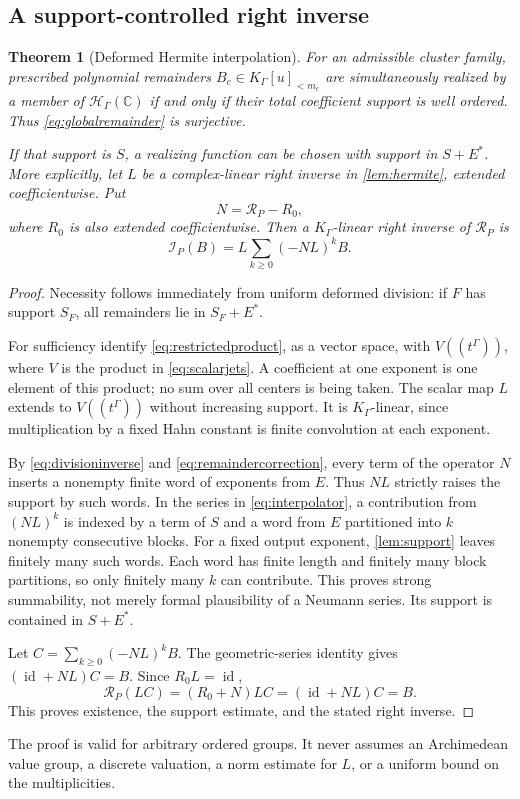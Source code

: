 \documentclass[11pt,letterpaper]{article}
\newtheorem{theorem}{Theorem}[section]
\theoremstyle{definition}
\theoremstyle{remark}
\newcommand{\C}{\mathbb C}
\newcommand{\HH}{\mathscr H_\Gamma}
\newcommand{\KG}{K_\Gamma}
\newcommand{\id}{\operatorname{id}}
\newcommand{\jet}{\mathcal R}
\numberwithin{equation}{section}
\begin{document}
\subsection{A support-controlled right inverse}
\begin{theorem}[Deformed Hermite interpolation]\label{thm:interpolation}
For an admissible cluster family, prescribed polynomial remainders $B_c\in\KG[u]_{<m_c}$ are simultaneously realized by a member of $\HH(\C)$ if and only if their total coefficient support is well ordered. Thus \eqref{eq:globalremainder} is surjective.

If that support is $S$, a realizing function can be chosen with support in $S+E^*$. More explicitly, let $L$ be a complex-linear right inverse in \cref{lem:hermite}, extended coefficientwise. Put
\[
 N=\jet_P-R_0,
\]
where $R_0$ is also extended coefficientwise. Then a $\KG$-linear right inverse of $\jet_P$ is
\begin{equation}\label{eq:interpolator}
 \mathcal I_P(B)=L\sum_{k\ge0}(-NL)^kB.
\end{equation}
\end{theorem}
\begin{proof}
Necessity follows immediately from uniform deformed division: if $F$ has support $S_F$, all remainders lie in $S_F+E^*$.

For sufficiency identify \eqref{eq:restrictedproduct}, as a vector space, with $V((t^\Gamma))$, where $V$ is the product in \eqref{eq:scalarjets}. A coefficient at one exponent is one element of this product; no sum over all centers is being taken. The scalar map $L$ extends to $V((t^\Gamma))$ without increasing support. It is $\KG$-linear, since multiplication by a fixed Hahn constant is finite convolution at each exponent.

By \eqref{eq:divisioninverse} and \eqref{eq:remaindercorrection}, every term of the operator $N$ inserts a nonempty finite word of exponents from $E$. Thus $NL$ strictly raises the support by such words. In the series in \eqref{eq:interpolator}, a contribution from $(NL)^k$ is indexed by a term of $S$ and a word from $E$ partitioned into $k$ nonempty consecutive blocks. For a fixed output exponent, \cref{lem:support} leaves finitely many such words. Each word has finite length and finitely many block partitions, so only finitely many $k$ can contribute. This proves strong summability, not merely formal plausibility of a Neumann series. Its support is contained in $S+E^*$.

Let $C=\sum_{k\ge0}(-NL)^kB$. The geometric-series identity gives $(\id+NL)C=B$. Since $R_0L=\id$,
\[
 \jet_P(LC)=(R_0+N)LC=(\id+NL)C=B.
\]
This proves existence, the support estimate, and the stated right inverse.
\end{proof}
The proof is valid for arbitrary ordered groups. It never assumes an Archimedean value group, a discrete valuation, a norm estimate for $L$, or a uniform bound on the multiplicities.
\end{document}
